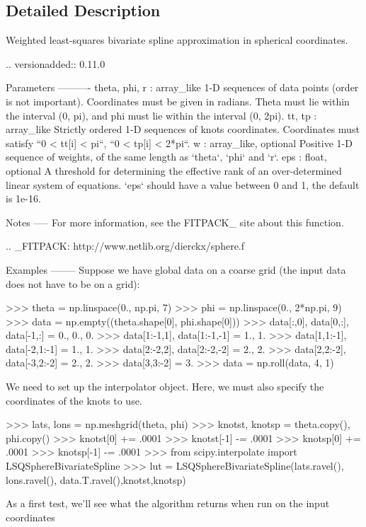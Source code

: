 \subsection{Detailed Description}
\begin{DoxyVerb}Weighted least-squares bivariate spline approximation in spherical
coordinates.

.. versionadded:: 0.11.0

Parameters
----------
theta, phi, r : array_like
    1-D sequences of data points (order is not important). Coordinates
    must be given in radians. Theta must lie within the interval (0, pi),
    and phi must lie within the interval (0, 2pi).
tt, tp : array_like
    Strictly ordered 1-D sequences of knots coordinates.
    Coordinates must satisfy ``0 < tt[i] < pi``, ``0 < tp[i] < 2*pi``.
w : array_like, optional
    Positive 1-D sequence of weights, of the same length as `theta`, `phi`
    and `r`.
eps : float, optional
    A threshold for determining the effective rank of an over-determined
    linear system of equations. `eps` should have a value between 0 and 1,
    the default is 1e-16.

Notes
-----
For more information, see the FITPACK_ site about this function.

.. _FITPACK: http://www.netlib.org/dierckx/sphere.f

Examples
--------
Suppose we have global data on a coarse grid (the input data does not
have to be on a grid):

>>> theta = np.linspace(0., np.pi, 7)
>>> phi = np.linspace(0., 2*np.pi, 9)
>>> data = np.empty((theta.shape[0], phi.shape[0]))
>>> data[:,0], data[0,:], data[-1,:] = 0., 0., 0.
>>> data[1:-1,1], data[1:-1,-1] = 1., 1.
>>> data[1,1:-1], data[-2,1:-1] = 1., 1.
>>> data[2:-2,2], data[2:-2,-2] = 2., 2.
>>> data[2,2:-2], data[-3,2:-2] = 2., 2.
>>> data[3,3:-2] = 3.
>>> data = np.roll(data, 4, 1)

We need to set up the interpolator object. Here, we must also specify the
coordinates of the knots to use.

>>> lats, lons = np.meshgrid(theta, phi)
>>> knotst, knotsp = theta.copy(), phi.copy()
>>> knotst[0] += .0001
>>> knotst[-1] -= .0001
>>> knotsp[0] += .0001
>>> knotsp[-1] -= .0001
>>> from scipy.interpolate import LSQSphereBivariateSpline
>>> lut = LSQSphereBivariateSpline(lats.ravel(), lons.ravel(),
                                   data.T.ravel(),knotst,knotsp)

As a first test, we'll see what the algorithm returns when run on the
input coordinates


\end{DoxyVerb}
